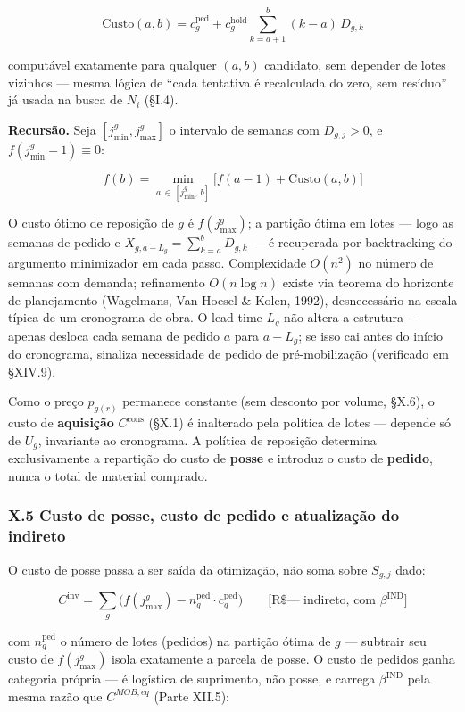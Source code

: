 \documentclass[
  10pt,
]{article}
\begin{document}
\[\boxed{\mathrm{Custo}(a,b) = c_g^{\text{ped}} + c_g^{\text{hold}}\sum_{k=a+1}^{b}(k-a)\,D_{g,k}}\]

computável exatamente para qualquer \((a,b)\) candidato, sem depender de
lotes vizinhos --- mesma lógica de ``cada tentativa é recalculada do
zero, sem resíduo'' já usada na busca de \(N_i\) (§I.4).

\textbf{Recursão.} Seja \([j_{\min}^g,j_{\max}^g]\) o intervalo de
semanas com \(D_{g,j}>0\), e \(f(j_{\min}^g-1)\equiv0\):

\[\boxed{f(b) = \min_{a\,\in\,[j_{\min}^g,\,b]}\big[f(a-1)+\mathrm{Custo}(a,b)\big]}\]

O custo ótimo de reposição de \(g\) é \(f(j_{\max}^g)\); a partição
ótima em lotes --- logo as semanas de pedido e
\(X_{g,a-L_g}=\sum_{k=a}^bD_{g,k}\) --- é recuperada por backtracking do
argumento minimizador em cada passo. Complexidade \(O(n^2)\) no número
de semanas com demanda; refinamento \(O(n\log n)\) existe via teorema do
horizonte de planejamento (Wagelmans, Van Hoesel \& Kolen, 1992),
desnecessário na escala típica de um cronograma de obra. O lead time
\(L_g\) não altera a estrutura --- apenas desloca cada semana de pedido
\(a\) para \(a-L_g\); se isso cai antes do início do cronograma,
sinaliza necessidade de pedido de pré-mobilização (verificado em
§XIV.9).

Como o preço \(p_{g(r)}\) permanece constante (sem desconto por volume,
§X.6), o custo de \textbf{aquisição} \(C^{\mathrm{cons}}\) (§X.1) é
inalterado pela política de lotes --- depende só de \(U_g\), invariante
ao cronograma. A política de reposição determina exclusivamente a
repartição do custo de \textbf{posse} e introduz o custo de
\textbf{pedido}, nunca o total de material comprado.

\hypertarget{x.5-custo-de-posse-custo-de-pedido-e-atualizauxe7uxe3o-do-indireto}{%
\subsubsection{X.5 Custo de posse, custo de pedido e atualização do
indireto}\label{x.5-custo-de-posse-custo-de-pedido-e-atualizauxe7uxe3o-do-indireto}}

O custo de posse passa a ser saída da otimização, não soma sobre
\(S_{g,j}\) dado:

\[\boxed{C^{\mathrm{inv}} = \sum_g\Big(f(j_{\max}^g)-n_g^{\text{ped}}\cdot c_g^{\text{ped}}\Big)}\qquad\text{[R\$ — indireto, com $\beta^{\mathrm{IND}}$]}\]

com \(n_g^{\text{ped}}\) o número de lotes (pedidos) na partição ótima
de \(g\) --- subtrair seu custo de \(f(j_{\max}^g)\) isola exatamente a
parcela de posse. O custo de pedidos ganha categoria própria --- é
logística de suprimento, não posse, e carrega \(\beta^{\mathrm{IND}}\)
pela mesma razão que \(C^{MOB,eq}\) (Parte XII.5):
\end{document}
